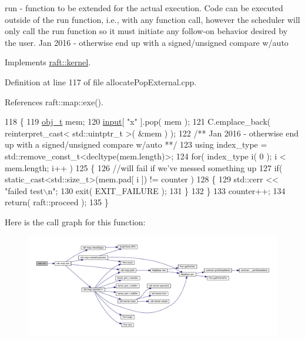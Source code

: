 run -\/ function to be extended for the actual execution. Code can be executed outside of the run function, i.\+e., with any function call, however the scheduler will only call the run function so it must initiate any follow-\/on behavior desired by the user. Jan 2016 -\/ otherwise end up with a signed/unsigned compare w/auto 

Implements \hyperlink{classraft_1_1kernel_a05094286d7577360fb1b91c91fc05901}{raft\+::kernel}.



Definition at line 117 of file allocate\+Pop\+External.\+cpp.



References raft\+::map\+::exe().


\begin{DoxyCode}
118     \{
119         \hyperlink{structfoo}{obj\_t} mem;
120         \hyperlink{classraft_1_1kernel_a6edbe35a56409d402e719b3ac36d6554}{input}[ \textcolor{stringliteral}{"x"} ].pop( mem );
121         C.emplace\_back( reinterpret\_cast< std::uintptr\_t >( &mem ) ); \textcolor{comment}{}
122 \textcolor{comment}{        /** Jan 2016 - otherwise end up with a signed/unsigned compare w/auto **/}
123         \textcolor{keyword}{using} index\_type = std::remove\_const\_t<decltype(mem.length)>;
124         \textcolor{keywordflow}{for}( index\_type i( 0 ); i < mem.length; i++ )
125         \{
126             \textcolor{comment}{//will fail if we've messed something up}
127             \textcolor{keywordflow}{if}( static\_cast<std::size\_t>(mem.pad[ i ]) != counter )
128             \{
129                 std::cerr << \textcolor{stringliteral}{"failed test\(\backslash\)n"}; 
130                 exit( EXIT\_FAILURE );
131             \}
132         \}
133         counter++;
134         \textcolor{keywordflow}{return}( raft::proceed );
135     \}
\end{DoxyCode}
Here is the call graph for this function\+:
\nopagebreak
\begin{figure}[H]
\begin{center}
\leavevmode
\includegraphics[width=350pt]{classlast_a7a1da1c30f571a8e8ccb515ca2cb2f02_cgraph}
\end{center}
\end{figure}
\hypertarget{classlast_a7a1da1c30f571a8e8ccb515ca2cb2f02}{}\label{classlast_a7a1da1c30f571a8e8ccb515ca2cb2f02} 
